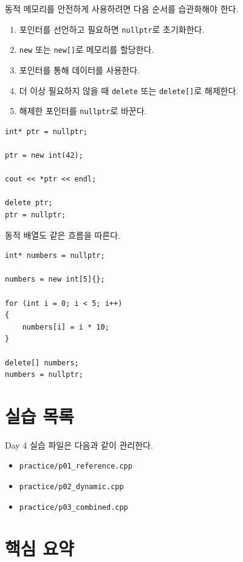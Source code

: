 \documentclass[11pt,a4paper]{article}
\begin{document}
동적 메모리를 안전하게 사용하려면 다음 순서를 습관화해야 한다.

\begin{enumerate}
    \item 포인터를 선언하고 필요하면 \texttt{nullptr}로 초기화한다.
    \item \texttt{new} 또는 \texttt{new[]}로 메모리를 할당한다.
    \item 포인터를 통해 데이터를 사용한다.
    \item 더 이상 필요하지 않을 때 \texttt{delete} 또는 \texttt{delete[]}로 해제한다.
    \item 해제한 포인터를 \texttt{nullptr}로 바꾼다.
\end{enumerate}

\begin{lstlisting}
int* ptr = nullptr;

ptr = new int(42);

cout << *ptr << endl;

delete ptr;
ptr = nullptr;
\end{lstlisting}

동적 배열도 같은 흐름을 따른다.

\begin{lstlisting}
int* numbers = nullptr;

numbers = new int[5]{};

for (int i = 0; i < 5; i++)
{
    numbers[i] = i * 10;
}

delete[] numbers;
numbers = nullptr;
\end{lstlisting}

\section{실습 목록}

\begin{practicebox}
Day 4 실습 파일은 다음과 같이 관리한다.
\begin{itemize}[leftmargin=1.5em]
    \item \texttt{practice/p01\_reference.cpp}
    \item \texttt{practice/p02\_dynamic.cpp}
    \item \texttt{practice/p03\_combined.cpp}
\end{itemize}
\end{practicebox}

\section{핵심 요약}
\end{document}
